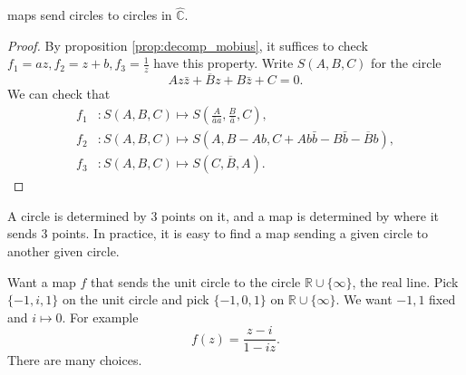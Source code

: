 \documentclass[a4paper]{article}
\begin{document}
\begin{theorem}\label{thm:6.8}
  \mobius maps send circles to circles in $ \hat{\mathbb{C}} $.
\end{theorem}
\begin{proof}
  By proposition \ref{prop:decomp_mobius}, it suffices to check $
  f_1=az,f_2=z+b,f_3=\frac{1}{z} $ have this property. Write
  $S(A,B,C)$ for the circle
  \[
    Az \bar{z}+ \overline{B}z+B \bar{z}+C=0. %
  \]
  We can check that
  \begin{align*}
    f_1&: S(A,B,C)\mapsto S\left(
    \frac{A}{\bar{a}a},\frac{B}{\bar{a}},C \right),\\
    f_2&: S(A,B,C)\mapsto S(A,B-Ab,C+Ab \bar{b}-B \bar{b}- \overline{B}b),\\
    f_3&: S(A,B,C) \mapsto S(C,\overline{B},A).
  \end{align*}
\end{proof}
\begin{remark}
  A circle is determined by 3 points on it, and a \mobius map is
  determined by where it sends 3 points. In practice, it is easy to
  find a \mobius map sending a given circle to another given circle.
\end{remark}
\begin{example}
  Want a \mobius map $f$ that sends the unit circle to the circle $
  \mathbb{R} \cup \{\infty\} $, the real line. Pick $ \{-1,i,1\} $ on
  the unit circle and pick $ \{-1,0,1\} $ on $ \mathbb{R} \cup
  \{\infty \} $. We want $-1,1$ fixed and $ i \mapsto 0 $. For example
  \[
    f(z)=\frac{z-i}{1-iz}.
  \]
  There are many choices.
\end{example}
\end{document}
